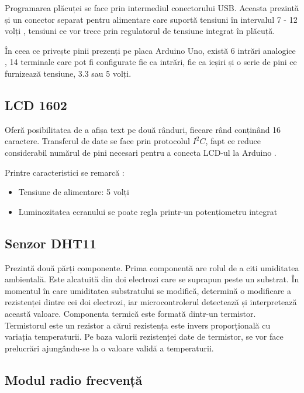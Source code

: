 	Programarea plăcuței se face prin intermediul conectorului USB. Aceasta prezintă și un conector separat pentru alimentare care suportă tensiuni în intervalul 7 - 12 volți \cite{arduino}, tensiuni ce vor trece prin regulatorul de tensiune integrat în plăcuță.

	În ceea ce privește pinii prezenți pe placa Arduino Uno, există 6 intrări analogice \cite{arduino}, 14 terminale care pot fi configurate fie ca intrări, fie ca ieșiri \cite{arduino} și o serie de pini ce furnizează tensiune, 3.3 sau 5 volți.

\subsection{LCD 1602}

	Oferă posibilitatea de a afișa text pe două rânduri, fiecare rând conținând 16 caractere. Transferul de date se face prin protocolul $I^2C$, fapt ce reduce considerabil numărul de pini necesari pentru a conecta LCD-ul la Arduino \cite{lcd}.

\vspace{1em}

	Printre caracteristici se remarcă \cite{lcd}:
 		\begin{itemize}
			\setlength{\itemindent}{2em}
			\itemsep0em
			\item Tensiune de alimentare: 5 volți 
			\item Luminozitatea ecranului se poate regla printr-un potențiometru integrat
		\end{itemize} 
	
\subsection{Senzor DHT11}

	Prezintă două părți componente. Prima componentă are rolul de a citi umiditatea ambientală. Este alcatuită din doi electrozi care se suprapun peste un substrat. În momentul în care umiditatea substratului se modifică, determină o modificare a rezistenței dintre cei doi electrozi, iar microcontrolerul detectează și interpretează această valoare. Componenta termică este formată dintr-un termistor. Termistorul este un rezistor a cărui rezistența este invers proporțională cu variația temperaturii. Pe baza valorii rezistenței date de termistor, se vor face prelucrări ajungându-se la o valoare validă a temperaturii.

\subsection{Modul radio frecvență}

